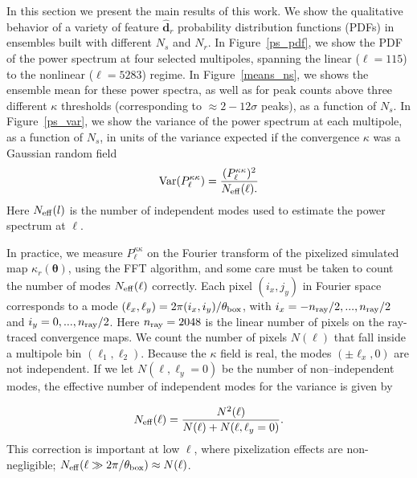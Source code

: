 \documentclass[reprint,aps,prd,superscriptaddress,showkeys,showpacs]{revtex4-1}
\newcommand{\bbh}[1]{\mathbf{\hat{#1}}}
\begin{document}

In this section we present the main results of this work. We show the
qualitative behavior of a variety of feature $\bbh{d}_r$ probability
distribution functions (PDFs) in ensembles built with different $N_s$
and $N_r$. In Figure~\ref{ps_pdf}, we show the PDF of the power
spectrum at four selected multipoles, spanning the linear ($\ell=115$)
to the nonlinear ($\ell=5283$) regime. In Figure~\ref{means_ns}, we
shows the ensemble mean for these power spectra, as well as for peak
counts above three different $\kappa$ thresholds (corresponding to
$\approx 2-12\sigma$ peaks), as a function of $N_s$.
In Figure~\ref{ps_var}, we show the variance of the power spectrum at
each multipole, as a function of $N_s$, in units of the variance
expected if the convergence $\kappa$ was a Gaussian random field
%
\begin{equation}
\label{gaussianvar}
\mathrm{Var}(P^{\kappa\kappa}_\ell) = \frac{(P^{\kappa\kappa}_\ell)^2}{N_{\rm eff}(\ell).}
\end{equation}
%
Here $N_{\rm eff}(l)$ is the number of independent modes used to
estimate the power spectrum at $\ell$.  

In practice, we measure $P^{\kappa\kappa}_\ell$ on the Fourier
transform of the pixelized simulated map $\kappa_r(\pmb{\theta})$,
using the FFT algorithm, and some care must be taken to count the
number of modes $N_{\rm eff}(\ell)$ correctly. Each pixel $(i_x,j_y)$
in Fourier space corresponds to a mode
$(\ell_x,\ell_y)=2\pi(i_x,i_y)/\theta_{\rm box}$, with $i_x=-n_{\rm
  ray}/2,...,n_{\rm ray}/2$ and $i_y=0,...,n_{\rm ray}/2$.
Here $n_{\rm ray}=2048$ is the linear number of pixels on the
ray-traced convergence maps.  We count the number of pixels $N(\ell)$
that fall inside a multipole bin $(\ell_1,\ell_2)$. Because the
$\kappa$ field is real, the modes $(\pm \ell_x,0)$ are not
independent. If we let $N(\ell,\ell_y=0)$ be the number of
non--independent modes, the effective number of independent modes
for the variance is given by

\begin{equation}
N_{\rm eff}(\ell) = \frac{N^2(\ell)}{N(\ell)+N(\ell,\ell_y=0)}.
\end{equation}
%
This correction is important at low $\ell$, where pixelization effects
are non-negligible; $N_{\rm eff}(\ell\gg2\pi/\theta_{\rm box})\approx
N(\ell)$.
\end{document}
